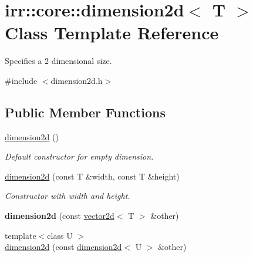 \hypertarget{classirr_1_1core_1_1dimension2d}{}\section{irr\+:\+:core\+:\+:dimension2d$<$ T $>$ Class Template Reference}
\label{classirr_1_1core_1_1dimension2d}


Specifies a 2 dimensional size.  




{\ttfamily \#include $<$dimension2d.\+h$>$}

\subsection*{Public Member Functions}
\begin{DoxyCompactItemize}
\item 
\hyperlink{classirr_1_1core_1_1dimension2d_ae0c2a30ce6283602c454901ef0bd6a04}{dimension2d} ()\hypertarget{classirr_1_1core_1_1dimension2d_ae0c2a30ce6283602c454901ef0bd6a04}{}\label{classirr_1_1core_1_1dimension2d_ae0c2a30ce6283602c454901ef0bd6a04}

\begin{DoxyCompactList}\small\item\em Default constructor for empty dimension. \end{DoxyCompactList}\item 
\hyperlink{classirr_1_1core_1_1dimension2d_a9032aa6e975b32497ed3b570e3d03b76}{dimension2d} (const T \&width, const T \&height)\hypertarget{classirr_1_1core_1_1dimension2d_a9032aa6e975b32497ed3b570e3d03b76}{}\label{classirr_1_1core_1_1dimension2d_a9032aa6e975b32497ed3b570e3d03b76}

\begin{DoxyCompactList}\small\item\em Constructor with width and height. \end{DoxyCompactList}\item 
{\bfseries dimension2d} (const \hyperlink{classirr_1_1core_1_1vector2d}{vector2d}$<$ T $>$ \&other)\hypertarget{classirr_1_1core_1_1dimension2d_a96f90d1d96392bf736a01f8def8aa7db}{}\label{classirr_1_1core_1_1dimension2d_a96f90d1d96392bf736a01f8def8aa7db}

\item 
{\footnotesize template$<$class U $>$ }\\\hyperlink{classirr_1_1core_1_1dimension2d_a50814f5fc29d226104d5739350befb31}{dimension2d} (const \hyperlink{classirr_1_1core_1_1dimension2d}{dimension2d}$<$ U $>$ \&other)\hypertarget{classirr_1_1core_1_1dimension2d_a50814f5fc29d226104d5739350befb31}{}\label{classirr_1_1core_1_1dimension2d_a50814f5fc29d226104d5739350befb31}


\end{DoxyCompactItemize}
